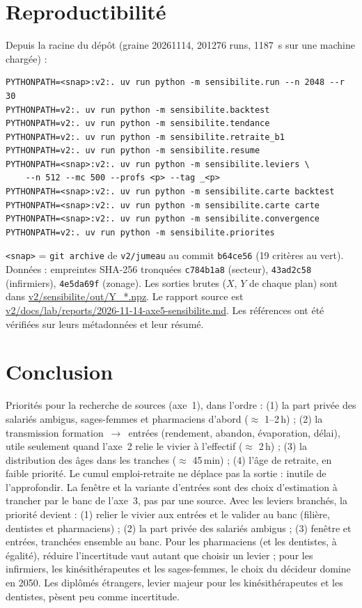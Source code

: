 \documentclass[11pt]{article}
\begin{document}
\section{Reproductibilité}
Depuis la racine du dépôt (graine \num{20261114}, \num{201276} runs, \SI{1187}{\second}\mesure{} sur une machine chargée) :
\begin{verbatim}
PYTHONPATH=<snap>:v2:. uv run python -m sensibilite.run --n 2048 --r 30
PYTHONPATH=v2:. uv run python -m sensibilite.backtest
PYTHONPATH=v2:. uv run python -m sensibilite.tendance
PYTHONPATH=v2:. uv run python -m sensibilite.retraite_b1
PYTHONPATH=v2:. uv run python -m sensibilite.resume
PYTHONPATH=<snap>:v2:. uv run python -m sensibilite.leviers \
    --n 512 --mc 500 --profs <p> --tag _<p>
PYTHONPATH=<snap>:v2:. uv run python -m sensibilite.carte backtest
PYTHONPATH=<snap>:v2:. uv run python -m sensibilite.carte carte
PYTHONPATH=<snap>:v2:. uv run python -m sensibilite.convergence
PYTHONPATH=v2:. uv run python -m sensibilite.priorites
\end{verbatim}
\texttt{<snap>} = \texttt{git archive} de \texttt{v2/jumeau} au commit \texttt{b64ce56} (19 critères au vert).
Données : empreintes SHA-256 tronquées \texttt{c784b1a8} (secteur), \texttt{43ad2c58} (infirmiers), \texttt{4e5da69f} (zonage). Les sorties brutes ($X$, $Y$ de chaque plan) sont dans \url{v2/sensibilite/out/Y_*.npz}. Le rapport source est \url{v2/docs/lab/reports/2026-11-14-axe5-sensibilite.md}. Les références ont été vérifiées sur leurs
métadonnées et leur résumé.

\section{Conclusion}
Priorités pour la recherche de sources (axe~1), dans l'ordre : (1) la part privée des salariés ambigus,
sages-femmes et pharmaciens d'abord ($\approx$ 1--2\,h\suppose{}) ; (2) la transmission formation~$\to$~entrées
(rendement, abandon, évaporation, délai), utile seulement quand l'axe~2 relie le vivier à l'effectif
($\approx$ 2\,h\suppose{}) ; (3) la distribution des âges dans les tranches ($\approx$ 45\,min\suppose{}) ;
(4) l'âge de retraite, en faible priorité. Le cumul emploi-retraite ne déplace pas la sortie : inutile de
l'approfondir. La fenêtre et la variante d'entrées sont des choix d'estimation à trancher par le banc de
l'axe~3, pas par une source. Avec les leviers branchés, la priorité devient : (1) relier le vivier aux entrées et le valider au
banc (filière, dentistes et pharmaciens) ; (2) la part privée des salariés ambigus ; (3) fenêtre et entrées,
tranchées ensemble au banc. Pour les pharmaciens (et les dentistes, à égalité), réduire l'incertitude vaut autant
que choisir un levier ; pour les infirmiers, les kinésithérapeutes et les sages-femmes, le choix du décideur domine
en 2050. Les diplômés étrangers, levier majeur pour les kinésithérapeutes et les dentistes, pèsent peu comme
incertitude.



\end{document}
